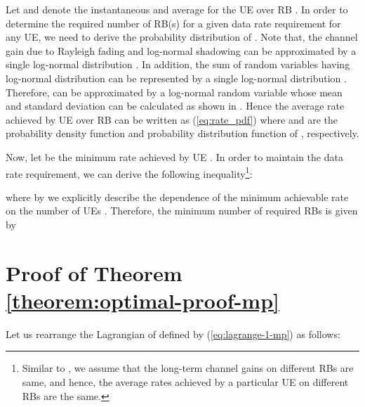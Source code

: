 \documentclass[twocolumn,10pt]{IEEEtran}
\begin{document}
Let  and  denote the instantaneous and average  for the UE  over RB .  In order to determine the required number of RB(s) for a given data rate requirement for any UE, we need to derive the probability distribution of   \cite{lee_qos}. Note that, the channel gain due to Rayleigh fading and log-normal shadowing can be approximated by a single log-normal distribution \cite{pdf_lognormal-1, pdf_lognormal}. In addition, the sum of random variables having log-normal distribution can be represented by a single log-normal distribution \cite{sum_lognormal}. Therefore,  can be approximated by a log-normal random
variable whose mean and standard deviation can be calculated
as shown in \cite{pdf_lognormal}. Hence the average rate achieved by UE   over RB  can be written as (\ref{eq:rate_pdf}) where  and  are the probability density function and probability distribution function of , respectively.



\begin{figure*}[!t]
\normalsize




\hrulefill
\vspace*{4pt}
\end{figure*}

Now, let  be the minimum rate achieved by UE . In order to maintain the data rate requirement, we can derive the following inequality\footnote{Similar to \cite{lee_qos}, we assume that the long-term channel gains on different RBs are same, and hence, the average rates achieved by a particular UE on different RBs are the same.}: 

where by  we explicitly describe the dependence of the minimum achievable rate   on the number of  UEs . Therefore, the minimum number of required RBs is given by




\section{Proof of Theorem \ref{theorem:optimal-proof-mp}} 
\label{app:optimal-mp}

\begin{figure*}[!t]
\normalsize




\hrulefill
\vspace*{4pt}
\end{figure*}

Let us rearrange the Lagrangian of   defined by (\ref{eq:lagrange-1-mp}) as follows:
\end{document}
